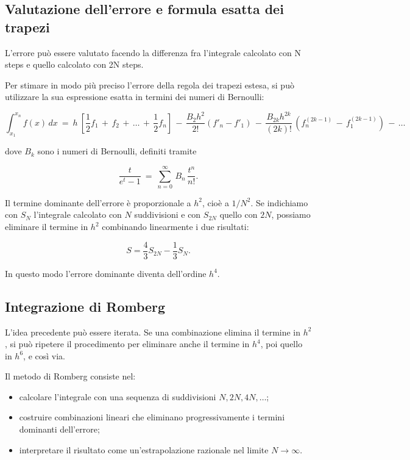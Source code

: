 \subsection{Valutazione dell’errore e formula esatta dei trapezi}

L'errore può essere valutato facendo la differenza fra l'integrale calcolato con N steps e quello calcolato con 2N steps.

Per stimare in modo più preciso l’errore della regola dei trapezi estesa, si può utilizzare la sua espressione esatta in termini dei numeri di Bernoulli:

\[
\int_{x_1}^{x_n} f(x)\,dx
\ =\
h\ \left[
\frac{1}{2}f_1\, +\, f_2\, +\, \dots\, +\, \frac{1}{2}f_n
\right]
\,-\,
\frac{B_2 h^2}{2!}\left(f'_n - f'_1\right)
\,-\,
\frac{B_{2k} h^{2k}}{(2k)!}\,
\left(f^{(2k-1)}_n\, -\, f^{(2k-1)}_1\right)
\,-\, \dots
\]

dove $B_k$ sono i numeri di Bernoulli, definiti tramite

\[
\frac{t}{e^t - 1}
\ =\
\sum_{n=0}^{\infty}\, B_n\, \frac{t^n}{n!}.
\]

Il termine dominante dell’errore è proporzionale a $h^2$, cioè a $1/N^2$. Se indichiamo con $S_N$ l’integrale calcolato con $N$ suddivisioni e con $S_{2N}$ quello con $2N$, possiamo eliminare il termine in $h^2$ combinando linearmente i due risultati:

\[
S = \frac{4}{3} S_{2N} - \frac{1}{3} S_N.
\]

In questo modo l’errore dominante diventa dell’ordine $h^4$.

\subsection{Integrazione di Romberg}

L’idea precedente può essere iterata. Se una combinazione elimina il termine in $h^2$, si può ripetere il procedimento per eliminare anche il termine in $h^4$, poi quello in $h^6$, e così via.

Il metodo di Romberg consiste nel:

\begin{itemize}
	\item calcolare l’integrale con una sequenza di suddivisioni $N, 2N, 4N, \dots$;
	\item costruire combinazioni lineari che eliminano progressivamente i termini dominanti dell’errore;
	\item interpretare il risultato come un’estrapolazione razionale nel limite $N \to \infty$.
\end{itemize}

